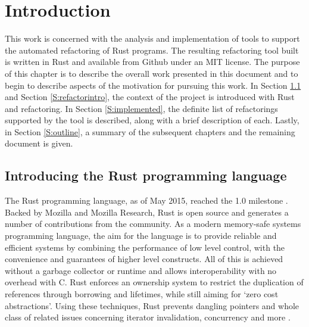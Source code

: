 \chapter{Introduction}\label{C:intro}
This work is concerned with the analysis and implementation of tools to support the automated refactoring of Rust programs. The resulting refactoring tool built is written in Rust and available from Github under an MIT license. The purpose of this chapter is to describe the overall work presented in this document and to begin to describe aspects of the motivation for pursuing this work. In Section \ref{S:rustintro} and Section \ref{S:refactorintro}, the context of the project is introduced with Rust and refactoring. In Section \ref{S:implemented}, the definite list of refactorings supported by the tool is described, along with a brief description of each. Lastly, in Section \ref{S:outline}, a summary of the subsequent chapters and the remaining document is given.


\section{Introducing the Rust programming language}\label{S:rustintro}


The Rust programming language, as of May 2015, reached the 1.0 milestone \cite{rustcore15}. Backed by Mozilla and Mozilla Research, Rust is open source and generates a number of contributions from the community. As a modern memory-safe systems programming language, the aim for the language is to provide reliable and efficient systems by combining the performance of low level control, with the convenience and guarantees of higher level constructs. All of this is achieved without a garbage collector or runtime and allows interoperability with no overhead with C. Rust enforces an ownership system to restrict the duplication of references through borrowing and lifetimes, while still aiming for `zero cost abstractions'. Using these techniques, Rust prevents dangling pointers and whole class of related issues concerning iterator invalidation, concurrency and more \cite{rustbook15}.

